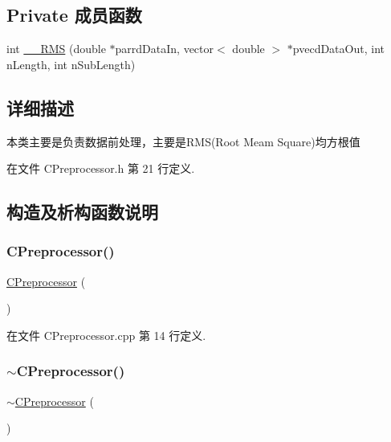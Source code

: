 \subsection*{Private 成员函数}
\begin{DoxyCompactItemize}
\item 
int \hyperlink{class_c_preprocessor_a0ecc6ebcfa0004ea81b419f5e052265a}{\+\_\+\+\_\+\+R\+MS} (double $\ast$parrd\+Data\+In, vector$<$ double $>$ $\ast$pvecd\+Data\+Out, int n\+Length, int n\+Sub\+Length)
\end{DoxyCompactItemize}


\subsection{详细描述}
本类主要是负责数据前处理，主要是\+R\+M\+S(\+Root Meam Square)均方根值 



在文件 C\+Preprocessor.\+h 第 21 行定义.



\subsection{构造及析构函数说明}
\mbox{\label{class_c_preprocessor_a717b5ebb25759e4b25a2caef6e8ebceb}} 
\subsubsection{\texorpdfstring{C\+Preprocessor()}{CPreprocessor()}}
{\footnotesize\ttfamily \hyperlink{class_c_preprocessor}{C\+Preprocessor} (\begin{DoxyParamCaption}{ }\end{DoxyParamCaption})}



在文件 C\+Preprocessor.\+cpp 第 14 行定义.

\mbox{\label{class_c_preprocessor_ab669c61dd49b3533163393e3f2f5aba1}} 
\subsubsection{\texorpdfstring{$\sim$\+C\+Preprocessor()}{~CPreprocessor()}}
{\footnotesize\ttfamily $\sim$\hyperlink{class_c_preprocessor}{C\+Preprocessor} (\begin{DoxyParamCaption}{ }\end{DoxyParamCaption})}



